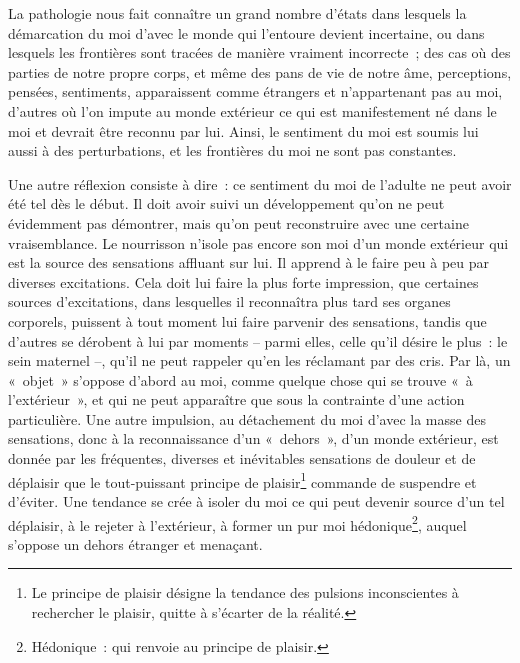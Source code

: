 {La pathologie nous fait connaître un grand nombre d'états dans
lesquels la démarcation du moi d'avec le monde qui l'entoure devient
incertaine, ou dans lesquels les frontières sont tracées de manière
vraiment incorrecte~; des cas où des parties de notre propre corps,
et même des pans de vie de notre âme, perceptions, pensées,
sentiments, apparaissent comme étrangers et n'appartenant pas au moi,
d'autres où l'on impute au monde extérieur ce qui est manifestement
né dans le moi et devrait être reconnu par lui. Ainsi, le sentiment
du moi est soumis lui aussi à des perturbations, et les frontières du
moi ne sont pas constantes.

Une autre réflexion consiste à dire~: ce sentiment du moi de l'adulte
ne peut avoir été tel dès le début. Il doit avoir suivi un
développement qu'on ne peut évidemment pas démontrer, mais qu'on peut
reconstruire avec une certaine vraisemblance. Le nourrisson n'isole
pas encore son moi d'un monde extérieur qui est la source des
sensations affluant sur lui. Il apprend à le faire peu à peu par
diverses excitations. Cela doit lui faire la plus forte impression,
que certaines sources d'excitations, dans lesquelles il reconnaîtra
plus tard ses organes corporels, puissent à tout moment lui faire
parvenir des sensations, tandis que d'autres se dérobent à lui par
moments – parmi elles, celle qu'il désire le plus~: le sein maternel
–, qu'il ne peut rappeler qu'en les réclamant par des cris. Par là,
un «~objet~» s'oppose d'abord au moi, comme quelque chose qui se
trouve «~à l'extérieur~», et qui ne peut apparaître que sous la
contrainte d'une action particulière. Une autre impulsion, au
détachement du moi d'avec la masse des sensations, donc à la
reconnaissance d'un «~dehors~», d'un monde extérieur, est donnée par
les fréquentes, diverses et inévitables sensations de douleur et de
déplaisir que le tout-puissant principe de plaisir\footnote{Le
principe de plaisir désigne la tendance des pulsions inconscientes à
rechercher le plaisir, quitte à s'écarter de la réalité.} commande de
suspendre et d'éviter. Une tendance se crée à isoler du moi ce qui
peut devenir source d'un tel déplaisir, à le rejeter à l'extérieur, à
former un pur moi hédonique\footnote{Hédonique~: qui renvoie au
principe de plaisir.}, auquel s'oppose un dehors étranger et
menaçant.
}

